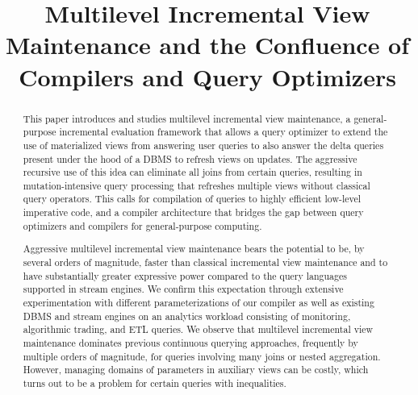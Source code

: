 \documentclass{sig-alternate}
\title{Multilevel Incremental View Maintenance and the Confluence of
Compilers and Query Optimizers}
\author{
}
\newcommand{\comment}[1]{}
\begin{document}
\maketitle


\begin{abstract}
This paper introduces and studies multilevel incremental view maintenance,
a general-purpose incremental
evaluation framework that allows a query optimizer to extend the use of
materialized views from answering user queries to also answer the delta
queries present under the hood of a DBMS to refresh views on updates. The
aggressive recursive use of this idea can eliminate all joins from certain
queries, resulting in mutation-intensive query processing that refreshes
multiple views without classical query operators. This calls for compilation of
queries to highly efficient low-level imperative code, and a compiler
architecture that bridges the gap between query optimizers and compilers for
general-purpose computing.


\comment{
Multilevel incremental view maintenance generalizes the idea of using
materialized views for query answering by allowing a query optimizer to use
materialized views for also answering delta queries, which are the auxiliary
queries that are used in incremental view maintenance to refresh materialized
views when updates happen. Aggressive recursive use of this idea allows to
eliminate all joins from certain queries and to generate highly efficient
low-level code without classical query operators that performs all query
evaluation and view refreshment work. This calls for the compilation of queries.

In this paper, we present a general compiler architecture for languages such as
SQL. To realize such a compiler, we overcome the challenges of materializing
views with binding patterns (parameters) to support arbitrarily nested queries
with aggregates, complex patterns of side effects that may arise, and the need
to perform sophisticated forms of deforestation and fusion frequently employed
in compilers but almost unknown in the database literature.
}

Aggressive multilevel incremental view maintenance bears the potential to be, by
several orders of magnitude, faster than classical incremental view
maintenance and to have substantially greater expressive power compared to the query
languages supported in stream engines.
%
%
We confirm this expectation through extensive experimentation with different
parameterizations of our compiler as well as existing DBMS and stream engines
on an analytics workload consisting of monitoring, algorithmic trading, and ETL
queries. We observe that multilevel incremental view maintenance dominates
previous continuous querying approaches, frequently by multiple orders of
magnitude, for queries involving many joins or nested aggregation. However,
managing domains of parameters in auxiliary views can be costly, which turns out
to be a problem for certain queries with inequalities.
\end{abstract}
\end{document}
